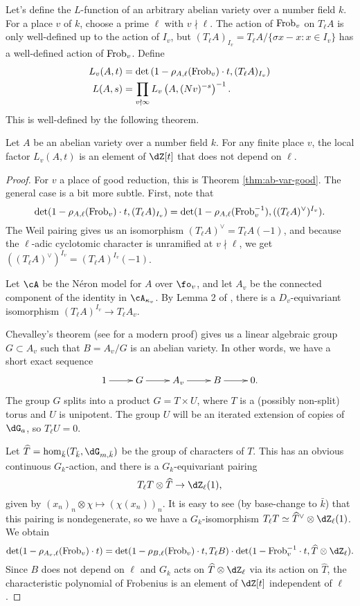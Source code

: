 Let's define the $L$-function of an arbitrary abelian variety over a number 
field $k$. For a place $v$ of $k$, choose a prime $\ell$ with $v\nmid \ell$. 
The action of $\mathrm{Frob}_v$ on $T_\ell A$ is only well-defined up to the action of 
$I_v$, but $(T_\ell A)_{I_v} = T_\ell A / \{\sigma x-x:x\in I_v\}$ has a 
well-defined action of $\mathrm{Frob}_v$. Define
\begin{align*}
  L_v(A,t) &= \det\left(1-\rho_{A,\ell}(\mathrm{Frob}_v)\cdot t,(T_\ell A)_{I_v}\right) \\
  L(A,s) &= \prod_{v\nmid \infty} L_v\left(A,(N v)^{-s}\right)^{-1} \text{.}
\end{align*}
This is well-defined by the following theorem. 

\begin{theorem}
Let $A$ be an abelian variety over a number field $k$. For any finite place 
$v$, the local factor $L_v(A,t)$ is an element of $\dZ[t]$ that does not depend 
on $\ell$. 
\end{theorem}
\begin{proof}
For $v$ a place of good reduction, this is Theorem \ref{thm:ab-var-good}. The 
general case is a bit more subtle. First, note that 
\[
  \det(1-\rho_{A,\ell}(\mathrm{Frob}_v)\cdot t,(T_\ell A)_{I_v}) 
    = \det(1-\rho_{A,\ell}(\mathrm{Frob}_v^{-1}),((T_\ell A)^\vee)^{I_v}) \text{.}
\]
The Weil pairing gives us an isomorphism $(T_\ell A)^\vee= T_\ell A(-1)$, 
and because the $\ell$-adic cyclotomic character is unramified at 
$v\nmid \ell$, we get $((T_\ell A)^\vee)^{I_v} = (T_\ell A)^{I_v}(-1)$. 

Let $\cA$ be the N\'eron model for $A$ over 
$\fo_v$, and let $A_v$ be the connected component of the identity in 
$\cA_{\kappa_v}$. By Lemma 2 of \cite{st68}, there is a $D_v$-equivariant 
isomorphism $(T_\ell A)^{I_v} \to T_\ell A_v$. 

Chevalley's theorem (see \cite{co02} for a modern proof) gives us a linear 
algebraic group $G\subset A_v$ such that $B=A_v/G$ is an abelian variety. In 
other words, we have a short exact sequence 
\[\xymatrix{
  1 \ar[r] 
    & G \ar[r] 
    & A_v \ar[r] 
    & B \ar[r] 
    & 0 \text{.} 
}\]
The group $G$ splits into a product $G=T\times U$, where $T$ is a (possibly 
non-split) torus and $U$ is unipotent. The group $U$ will be an iterated 
extension of copies of $\dG_a$, so $T_\ell U=0$. 

Let $\widehat T=\hom_{\bar k}(T_{\bar k},\dG_{m,\bar k})$ be the group of 
characters of $T$. This has an obvious continuous $G_k$-action, and there is a 
$G_k$-equivariant pairing 
\[
  T_\ell T \otimes \widehat T \to \dZ_\ell(1) \text{,}
\]
given by $(x_n)_n\otimes \chi \mapsto (\chi(x_n))_n$. It is easy to see (by 
base-change to $\bar k$) that this pairing is nondegenerate, so we have a 
$G_k$-isomorphism $T_\ell T \simeq \widehat T^\vee \otimes \dZ_\ell(1)$. 
We obtain 
\[
  \det(1-\rho_{A_v,\ell}(\frob_v)\cdot t) = \det(1-\rho_{B,\ell}(\frob_v)\cdot t,T_\ell B) \cdot \det(1-\frob_v^{-1}\cdot t,\widehat T\otimes \dZ_\ell) \text{.}
\]
Since $B$ does not depend on $\ell$ and $G_k$ acts on 
$\widehat T\otimes \dZ_\ell$ via its action on $\widehat T$, the characteristic 
polynomial of Frobenius is an element of $\dZ[t]$ independent of $\ell$. 
\end{proof}

